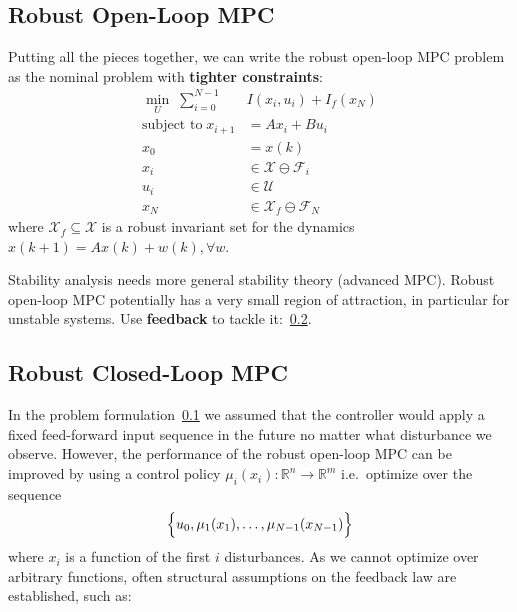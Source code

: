 \subsection{Robust Open-Loop MPC}\label{robust_OL_MPC}
Putting all the pieces together, we can write the robust open-loop MPC problem as the nominal problem with \textbf{tighter constraints}:
\begin{align*}
    \min_{U}\;          \sum_{i=0}^{N-1} & I(x_i,u_i)+I_f(x_N)                      \\
    \text{subject to}\; x_{i+1}          & =Ax_{i}+Bu_{i}                           \\
    x_0                                  & =x(k)                                    \\
    x_i                                  & \in\mathcal{X} \ominus \mathcal{F}_i     \\
    u_{i}                                & \in\mathcal{U}                           \\
    x_N                                  & \in\mathcal{X}_{f} \ominus \mathcal{F}_N
\end{align*}
where $\mathcal{X}_f \subseteq \mathcal{X}$ is a robust invariant set for the dynamics $x(k+1) = Ax(k) + w(k) , \forall w$.
\newpar{}

Stability analysis needs more general stability theory (advanced MPC).
\newpar{}
Robust open-loop MPC potentially has a very small region of attraction, in particular for unstable systems. Use \textbf{feedback} to tackle it:~\ref{robust_CL_MPC}.

\subsection{Robust Closed-Loop MPC}\label{robust_CL_MPC}
In the problem formulation~\ref{robust_OL_MPC} we assumed that the controller would apply a fixed feed-forward input sequence in the future no matter what disturbance we observe. However, the performance of the robust open-loop MPC can be improved by using a control policy $\mu_i(x_i) : \mathbb{R}^n\to \mathbb{R}^m$ i.e.\ optimize over the sequence
\begin{equation*}
    \Bigl\{ u_0, \mu_1(x_1), \ldots, \mu_{N-1}(x_{N-1})\Bigr\}
\end{equation*}
where $x_i$ is a function of the first $i$ disturbances.
\newpar{}
As we cannot optimize over arbitrary functions, often structural assumptions on the feedback law are established, such as:

